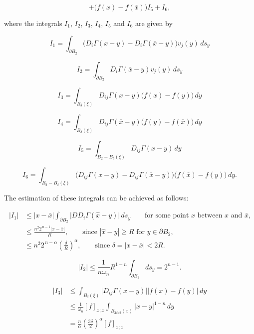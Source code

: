 \begin{lemma}
\[
+\bigl(f(x)-f(\bar{x})\bigr)I_5+I_6,
\]



where the integrals $I_1$, $I_2$, $I_3$, $I_4$, $I_5$ and $I_6$ are given by

\begin{equation}
I_1=\int_{\partial B_2}\bigl(D_i\Gamma(x-y)-D_i\Gamma(\bar{x}-y)\bigr)v_j(y)\,ds_y
\end{equation}

\begin{equation}
I_2=\int_{\partial B_2}D_i\Gamma(\bar{x}-y)v_j(y)\,ds_y
\end{equation}

\begin{equation}
I_3=\int_{B_\delta(\xi)}D_{ij}\Gamma(x-y)\bigl(f(x)-f(y)\bigr)\,dy
\end{equation}

\begin{equation}
I_4=\int_{B_\delta(\xi)}D_{ij}\Gamma(\bar{x}-y)\bigl(f(y)-f(\bar{x})\bigr)\,dy
\end{equation}

\begin{equation}
I_5=\int_{B_2-B_\delta(\xi)}D_{ij}\Gamma(x-y)\,dy
\end{equation}

\begin{equation}
I_6=\int_{B_2-B_\delta(\xi)}\bigl(D_{ij}\Gamma(x-y)-D_{ij}\Gamma(\bar{x}-y)\bigr)\bigl(f(\bar{x})-f(y)\bigr)\,dy.
\end{equation}

The estimation of these integrals can be achieved as follows:

\begin{align*}
|I_1|&\le |x-\bar{x}|\int_{\partial B_2}\bigl|DD_i\Gamma(\hat{x}-y)\bigr|\,ds_y
\qquad \text{for some point $\hat{x}$ between $x$ and $\bar{x}$,}\\
&\le \frac{n^2 2^{\,n-1}|x-\bar{x}|}{R}, \qquad \text{since $|\hat{x}-y|\ge R$ for $y\in \partial B_2$,}\\
&\le n^2 2^{\,n-\alpha}\left(\frac{\delta}{R}\right)^\alpha, \qquad \text{since $\delta=|x-\bar{x}|<2R$.}
\end{align*}

\begin{equation}
|I_2|\le \frac{1}{n\omega_n}R^{1-n}\int_{\partial B_2}ds_y=2^{n-1}.
\end{equation}

\begin{align*}
|I_3|&\le \int_{B_\delta(\xi)}\bigl|D_{ij}\Gamma(x-y)\bigr|\bigl|f(x)-f(y)\bigr|\,dy\\
&\le \frac{1}{\omega_n}[f]_{x;x}\int_{B_{3\delta/2}(x)}|x-y|^{1-n}\,dy\\
&= \frac{n}{\alpha}\left(\frac{3\delta}{2}\right)^\alpha [f]_{x;x}
\end{align*}


\end{lemma}
